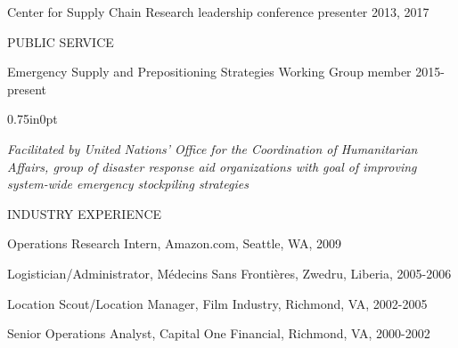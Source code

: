 \documentclass[letterpaper,11pt,oneside]{article}
\newcommand\myIndent{0.75in}
\newcommand\myParSkip{3pt}
\newcommand\myHangIndent{1in}
\newcommand\mySpaceBeforeSection{0.9em}
\newcommand{\NiceIndent}{ \parindent=\myIndent \hangindent=\myHangIndent }
\newenvironment{miniListBullet}
    {
        \begin{adjustwidth}{\myIndent}{0pt}
        \setlength{\parskip}{0pt}%
        \renewcommand\labelitemi{{\boldmath$\cdot$}}
        \begin{itemize}
        \setlength\itemsep{0em}
    }
    {
        \end{itemize}
        \setlength{\parskip}{\myParSkip}%
        \end{adjustwidth}
    }
\begin{document}
\NiceIndent Center for Supply Chain Research leadership conference presenter 2013, 2017

\vspace{\mySpaceBeforeSection}
\noindent PUBLIC SERVICE

\NiceIndent Emergency Supply and Prepositioning Strategies Working Group member 2015-present
\begin{miniListBullet}
    \textit{Facilitated by United Nations' Office for the Coordination of Humanitarian Affairs, group of disaster response aid organizations with goal of improving system-wide emergency stockpiling strategies}
\end{miniListBullet}

\vspace{\mySpaceBeforeSection}
\noindent INDUSTRY EXPERIENCE

\NiceIndent Operations Research Intern, Amazon.com, Seattle, WA, 2009

\NiceIndent Logistician/Administrator, M\'edecins Sans Fronti\`eres, Zwedru, Liberia, 2005-2006


\NiceIndent Location Scout/Location Manager, Film Industry, Richmond, VA, 2002-2005

\NiceIndent Senior Operations Analyst, Capital One Financial, Richmond, VA, 2000-2002
\end{document}
